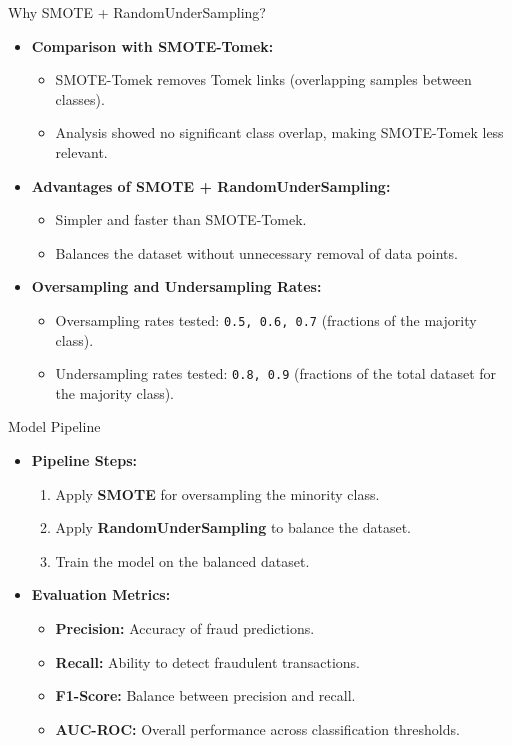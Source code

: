 \documentclass{beamer}
\begin{document}
\begin{frame}{Why SMOTE + RandomUnderSampling?}
    \begin{itemize}
        \item \textbf{Comparison with SMOTE-Tomek:}
        \begin{itemize}
            \item SMOTE-Tomek removes Tomek links (overlapping samples between classes).
            \item Analysis showed no significant class overlap, making SMOTE-Tomek less relevant.
        \end{itemize}
        \item \textbf{Advantages of SMOTE + RandomUnderSampling:}
        \begin{itemize}
            \item Simpler and faster than SMOTE-Tomek.
            \item Balances the dataset without unnecessary removal of data points.
        \end{itemize}
        \item \textbf{Oversampling and Undersampling Rates:}
        \begin{itemize}
            \item Oversampling rates tested: \texttt{0.5, 0.6, 0.7} (fractions of the majority class).
            \item Undersampling rates tested: \texttt{0.8, 0.9} (fractions of the total dataset for the majority class).
        \end{itemize}
    \end{itemize}
\end{frame}

\begin{frame}{Model Pipeline}
    \begin{itemize}
        \item \textbf{Pipeline Steps:}
        \begin{enumerate}
            \item Apply \textbf{SMOTE} for oversampling the minority class.
            \item Apply \textbf{RandomUnderSampling} to balance the dataset.
            \item Train the model on the balanced dataset.
        \end{enumerate}
        \item \textbf{Evaluation Metrics:}
        \begin{itemize}
            \item \textbf{Precision:} Accuracy of fraud predictions.
            \item \textbf{Recall:} Ability to detect fraudulent transactions.
            \item \textbf{F1-Score:} Balance between precision and recall.
            \item \textbf{AUC-ROC:} Overall performance across classification thresholds.
        \end{itemize}
    \end{itemize}
\end{frame}
\end{document}
